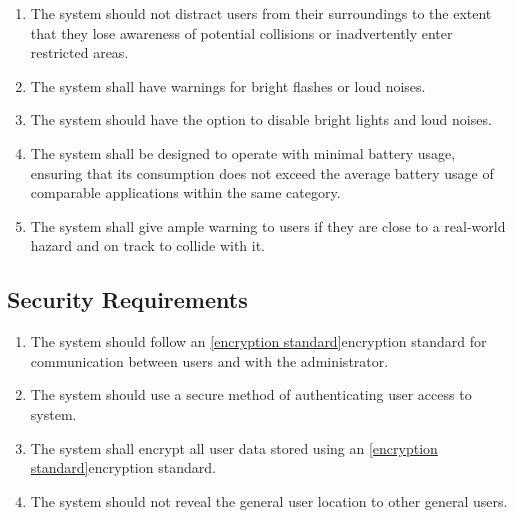 \documentclass{article}
\begin{document}
\begin{enumerate}[label=\textbf{SAR-\arabic*},ref=SAR-\arabic*]
    \item \label{SAR-1} The system should not distract users from their surroundings to the extent that they lose awareness of potential collisions or inadvertently enter restricted areas. \\
    \item \label{SAR-2} The system shall have warnings for bright flashes or loud noises. \\
    \item \label{SAR-3} The system should have the option to disable bright lights and loud noises. \\
    \item \label{SAR-4} The system shall be designed to operate with minimal battery usage, ensuring that its consumption does not exceed the average battery usage of comparable applications within the same category. \\
    \item \label{SAR-5} The system shall give ample warning to users if they are close to a real-world hazard and on track to collide with it. \\
\end{enumerate}

\subsection{Security Requirements}

\begin{enumerate}[label=\textbf{SER-\arabic*},ref=SER-\arabic*]
    \item \label{SER-1} The system should follow an \ref{encryption standard}encryption standard for communication between users and with the administrator. \\
    \item \label{SER-2} The system should use a secure method of authenticating user access to system. \\
    \item \label{SER-3} The system shall encrypt all user data stored using an \ref{encryption standard}encryption standard. \\
    \item \label{SER-4} The system should not reveal the general user location to other general users. \\
\end{enumerate}
\end{document}
